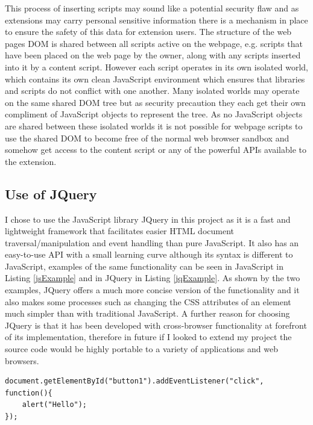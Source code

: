 \documentclass[12pt]{article}
\begin{document}
This process of inserting scripts may sound like a potential security flaw and as extensions may carry personal sensitive information there is a mechanism in place to ensure the safety of this data for extension users. The structure of the web pages DOM is shared between all scripts active on the webpage, e.g. scripts that have been placed on the web page by the owner, along with any scripts inserted into it by a content script. However each script operates in its own isolated world, which contains its own clean JavaScript environment which ensures that libraries and scripts do not conflict with one another. Many isolated worlds may operate on the same shared DOM tree but as security precaution they each get their own compliment of JavaScript objects to represent the tree. As no JavaScript objects are shared between these isolated worlds it is not possible for webpage scripts to use the shared DOM to become free of the normal web browser sandbox and somehow get access to the content script or any of the powerful APIs available to the extension. 

\subsection{Use of JQuery}
I chose to use the JavaScript library JQuery in this project as it is a fast and lightweight framework that facilitates easier HTML document traversal/manipulation and event handling than pure JavaScript. It also has an easy-to-use API with a small learning curve although its syntax is different to JavaScript, examples of the same functionality can be seen in JavaScript in Listing \ref{jsExample} and in JQuery in Listing \ref{jqExample}. As shown by the two examples, JQuery offers a much more concise version of the functionality and it also makes some processes such as changing the CSS attributes of an element much simpler than with traditional JavaScript. A further reason for choosing  JQuery is that it has been developed with cross-browser functionality at forefront of its  implementation, therefore in future if I looked to extend my project the source code would be highly portable to a variety of applications and web browsers. 

\begin{lstlisting}[caption=Setting the onClick functionality of button in JavaScript, label={jsExample}]
document.getElementById("button1").addEventListener("click", function(){ 
    alert("Hello");
});
\end{lstlisting}
\end{document}
